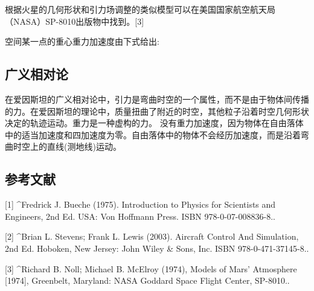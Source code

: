 根据火星的几何形状和引力场调整的类似模型可以在美国国家航空航天局（NASA）SP-8010出版物中找到。[3]

空间某一点的重心重力加速度由下式给出:


\subsection{广义相对论}

在爱因斯坦的广义相对论中，引力是弯曲时空的一个属性，而不是由于物体间传播的力。在爱因斯坦的理论中，质量扭曲了附近的时空，其他粒子沿着时空几何形状决定的轨迹运动。重力是一种虚构的力。 没有重力加速度，因为物体在自由落体中的适当加速度和四加速度为零。自由落体中的物体不会经历加速度，而是沿着弯曲时空上的直线(测地线)运动。

\subsection{参考文献}

[1]
^Fredrick J. Bueche (1975). Introduction to Physics for Scientists and Engineers, 2nd Ed. USA: Von Hoffmann Press. ISBN 978-0-07-008836-8..

[2]
^Brian L. Stevens; Frank L. Lewis (2003). Aircraft Control And Simulation, 2nd Ed. Hoboken, New Jersey: John Wiley & Sons, Inc. ISBN 978-0-471-37145-8..

[3]
^Richard B. Noll; Michael B. McElroy (1974), Models of Mars' Atmosphere [1974], Greenbelt, Maryland: NASA Goddard Space Flight Center, SP-8010..